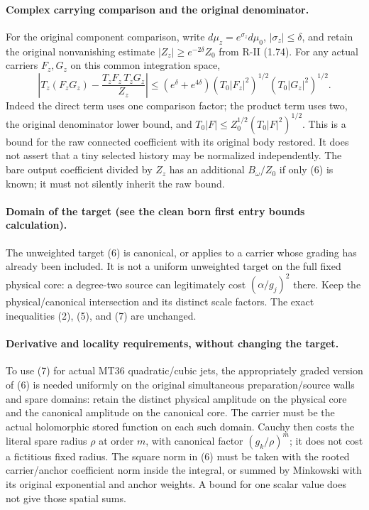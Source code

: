 \documentclass[11pt]{article}
\begin{document}
\paragraph{Complex carrying comparison and the original denominator.}
For the original component comparison, write
$d\mu_z=e^{\sigma_z}d\mu_0$, $|\sigma_z|\le\delta$, and retain the original
nonvanishing estimate $|Z_z|\ge e^{-2\delta}Z_0$ from R-II (1.74).
For any actual carriers $F_z,G_z$ on this common integration space,
\[
 \left|T_z(F_zG_z)-\frac{T_zF_z\,T_zG_z}{Z_z}\right|
 \le(e^\delta+e^{4\delta})
       (T_0|F_z|^2)^{1/2}(T_0|G_z|^2)^{1/2}.            \tag{7}
\]
Indeed the direct term uses one comparison factor; the product term uses two,
the original denominator lower bound, and $T_0|F|\le Z_0^{1/2}(T_0|F|^2)^{1/2}$.
This is a bound for the raw connected coefficient with its original body restored.
It does not assert that a tiny selected history may be normalized independently.
The bare output coefficient divided by $Z_z$ has an additional $B_\omega/Z_0$
if only (6) is known; it must not silently inherit the raw bound.

\paragraph{Domain of the target (see the clean born first entry bounds calculation).}
The unweighted target (6) is canonical, or applies to a carrier whose grading
has already been included. It is not a uniform unweighted target on the full
fixed physical core: a degree-two source can legitimately cost $(\alpha/g_j)^2$
there. Keep the physical/canonical intersection and its distinct scale factors.
The exact inequalities (2), (5), and (7) are unchanged.

\paragraph{Derivative and locality requirements, without changing the target.}
To use (7) for actual MT36 quadratic/cubic jets, the appropriately graded
version of (6) is needed uniformly on the original simultaneous preparation/source
walls and spare domains: retain the distinct physical amplitude on the physical
core and the canonical amplitude on the canonical core. The carrier must be the
actual holomorphic stored function on each such domain.
Cauchy then costs the literal spare radius $\rho$ at order $m$, with canonical
factor $(g_k/\rho)^m$; it does not cost a fictitious fixed radius. The square norm
in (6) must be taken with the rooted carrier/anchor coefficient norm inside the
integral, or summed by Minkowski with its original exponential and anchor weights.
A bound for one scalar value does not give those spatial sums.
\end{document}
